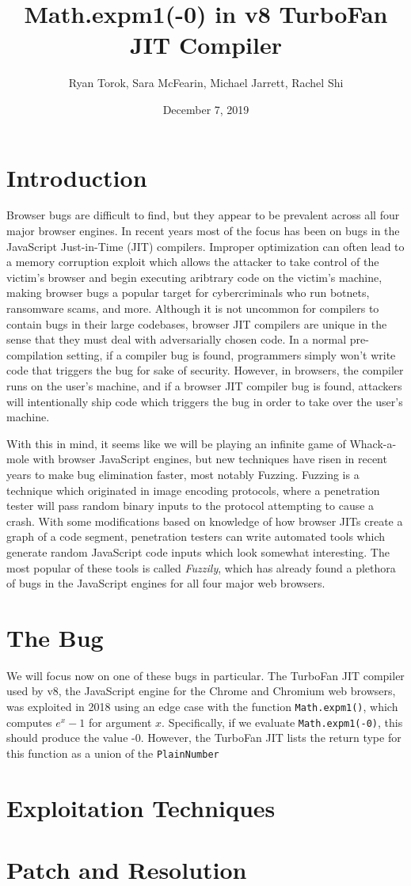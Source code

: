 \documentclass[11pt]{article}
\title{Math.expm1(-0) in v8 TurboFan JIT Compiler}
\author{Ryan Torok, Sara McFearin, Michael Jarrett, Rachel Shi}
\date{December 7, 2019}
\begin{document}
\maketitle
\section{Introduction}
Browser bugs are difficult to find, but they appear to be prevalent across all four major browser
engines. In recent years most of the focus has been on bugs in the JavaScript Just-in-Time (JIT)
compilers. Improper optimization can often lead to a memory corruption exploit which allows the
attacker to take control of the victim's browser and begin executing aribtrary code on the victim's
machine, making browser bugs a popular target for cybercriminals who run botnets, ransomware scams,
and more. Although it is not uncommon for compilers to contain bugs in their large codebases,
browser JIT compilers are unique in the sense that they must deal with adversarially chosen code. In
a normal pre-compilation setting, if a compiler bug is found, programmers simply won't write code
that triggers the bug for sake of security. However, in browsers, the compiler runs on the user's
machine, and if a browser JIT compiler bug is found, attackers will intentionally ship code which
triggers the bug in order to take over the user's machine. 

With this in mind, it seems like we will be playing an infinite game of Whack-a-mole with browser
JavaScript engines, but new techniques have risen in recent years to make bug elimination faster,
most notably Fuzzing. Fuzzing is a technique which originated in image encoding protocols, where a
penetration tester will pass random binary inputs to the protocol attempting to cause a crash. With
some modifications based on knowledge of how browser JITs create a graph of a code segment,
penetration testers can write automated tools which generate random JavaScript code inputs which
look somewhat interesting. The most popular of these tools is called \textit{Fuzzily}, which has
already found a plethora of bugs in the JavaScript engines for all four major web browsers.

\section{The Bug}
We will focus now on one of these bugs in particular. The TurboFan JIT compiler used by v8, the
JavaScript engine for the Chrome and Chromium web browsers, was exploited in 2018 using an edge
case with the function \texttt{Math.expm1()}, which computes $e^x -1$ for argument $x$.
Specifically, if we evaluate \texttt{Math.expm1(-0)}, this should produce the value -0. However, the
TurboFan JIT lists the return type for this function as a union of the \texttt{PlainNumber} 
\section{Exploitation Techniques}
\section{Patch and Resolution}
\end{document}
